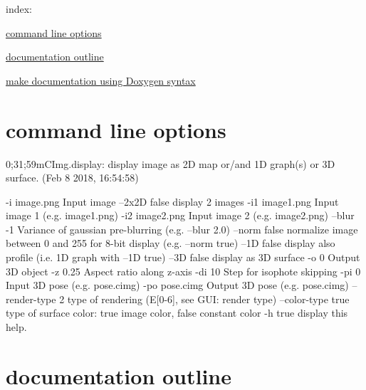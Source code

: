 index\-: \begin{DoxyItemize}
\item \hyperlink{index_sectionCommandLine}{command line options} \item \hyperlink{index_sectionDisplayDocumentation}{documentation outline} \item \hyperlink{index_sectionDoxygenSyntax}{make documentation using Doxygen syntax}\end{DoxyItemize}
\hypertarget{index_sectionCommandLine}{}\section{command line options}\label{index_sectionCommandLine}

\begin{DoxyVerbInclude}

 0;31;59mCImg.display: display image as 2D map or/and 1D graph(s) or 3D surface. (Feb  8 2018, 16:54:58)

    -i               image.png                Input image
    --2x2D           false                    display 2 images
    -i1              image1.png               Input image 1 (e.g. image1.png)
    -i2              image2.png               Input image 2 (e.g. image2.png)
    --blur           -1                       Variance of gaussian pre-blurring (e.g. --blur 2.0)
    --norm           false                    normalize image between 0 and 255 for 8-bit display (e.g. --norm true)
    --1D             false                    display also profile (i.e. 1D graph with --1D true)
    --3D             false                    display as 3D surface
    -o               0                        Output 3D object
    -z               0.25                     Aspect ratio along z-axis
    -di              10                       Step for isophote skipping
    -pi              0                        Input 3D pose  (e.g. pose.cimg)
    -po              pose.cimg                Output 3D pose (e.g. pose.cimg)
    --render-type    2                        type of rendering (E[0-6], see GUI: render type)
    --color-type     true                     type of surface color: true image color, false constant color
    -h               true                     display this help.
\end{DoxyVerbInclude}
\hypertarget{index_sectionDisplayDocumentation}{}\section{documentation outline}\label{index_sectionDisplayDocumentation}
